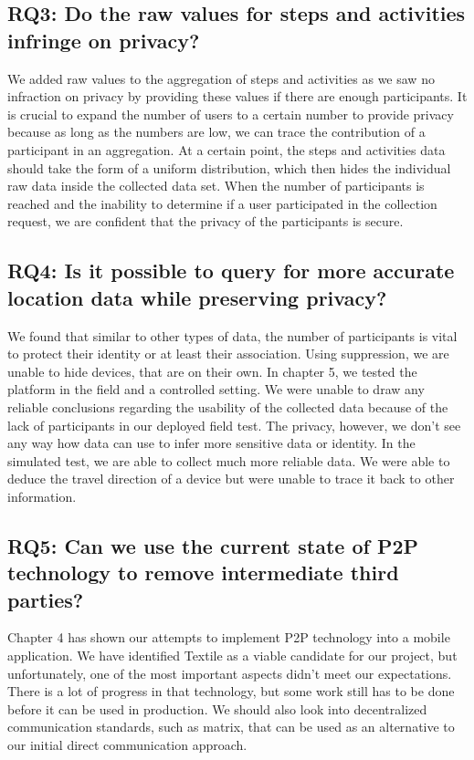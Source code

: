 \subsection*{RQ3: Do the raw values for steps and activities infringe on privacy?}
We added raw values to the aggregation of steps and activities as we saw no infraction on privacy by providing these values if there are enough participants. It is crucial to expand the number of users to a certain number to provide privacy because as long as the numbers are low, we can trace the contribution of a participant in an aggregation. At a certain point, the steps and activities data should take the form of a uniform distribution, which then hides the individual raw data inside the collected data set. When the number of participants is reached and the inability to determine if a user participated in the collection request, we are confident that the privacy of the participants is secure. 

\subsection*{RQ4: Is it possible to query for more accurate location data while preserving privacy?}
We found that similar to other types of data, the number of participants is vital to protect their identity or at least their association. Using suppression, we are unable to hide devices, that are on their own. In chapter 5, we tested the platform in the field and a controlled setting. We were unable to draw any reliable conclusions regarding the usability of the collected data because of the lack of participants in our deployed field test. The privacy, however, we don't see any way how data can use to infer more sensitive data or identity. In the simulated test, we are able to collect much more reliable data. We were able to deduce the travel direction of a device but were unable to trace it back to other information.

\subsection*{RQ5: Can we use the current state of P2P technology to remove intermediate third parties?}
Chapter 4 has shown our attempts to implement P2P technology into a mobile application. We have identified Textile as a viable candidate for our project, but unfortunately, one of the most important aspects didn't meet our expectations. There is a lot of progress in that technology, but some work still has to be done before it can be used in production. We should also look into decentralized communication standards, such as matrix, that can be used as an alternative to our initial direct communication approach.

